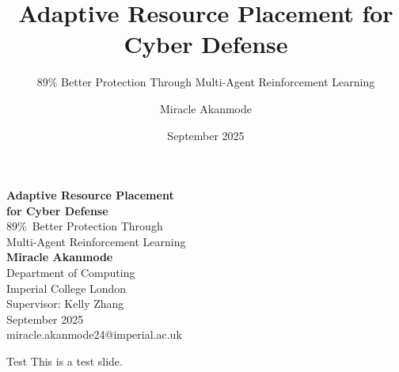 \documentclass[aspectratio=169,xcolor=dvipsnames]{beamer}
\title{Adaptive Resource Placement for Cyber Defense}
\subtitle{89\% Better Protection Through Multi-Agent Reinforcement Learning}
\author{Miracle Akanmode}
\institute{Imperial College London}
\date{September 2025}
\begin{document}
\begin{frame}[plain]
\begin{center}
\vspace{0.5cm}

{\LARGE\textbf{\textcolor{ImperialNavy}{Adaptive Resource Placement}}}\\[0.2cm]
{\LARGE\textbf{\textcolor{ImperialNavy}{for Cyber Defense}}}\\[0.4cm]

{\large\textcolor{ImperialBlue}{89\%~Better Protection Through}}\\[0.1cm]
{\large\textcolor{ImperialBlue}{Multi-Agent Reinforcement Learning}}\\[0.8cm]

{\large\textbf{Miracle Akanmode}}\\[0.2cm]
{\normalsize Department of Computing}\\
{\normalsize Imperial College London}\\[0.2cm]
{\normalsize Supervisor: Kelly Zhang}\\[0.6cm]

{\normalsize September 2025}\\[0.3cm]

{\small\textcolor{ImperialBlue}{miracle.akanmode24@imperial.ac.uk}}

\end{center}
\end{frame}

\begin{frame}{Test}
This is a test slide.
\end{frame}
\end{document}
